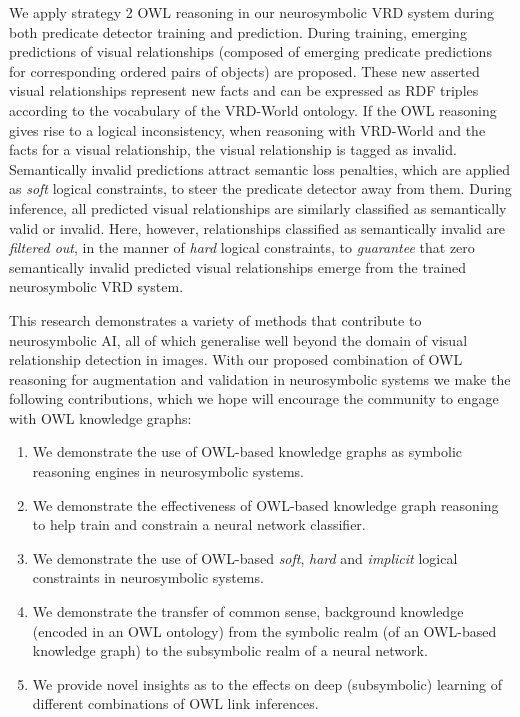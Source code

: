 \documentclass[]{jair}
\begin{document}
We apply strategy 2 OWL reasoning in our neurosymbolic VRD system during both predicate detector training and prediction.
During training, emerging predictions of visual relationships (composed of emerging predicate predictions for corresponding ordered pairs of objects) are proposed.
These new asserted visual relationships represent new facts and can be expressed as RDF triples \cite{RDFS/spec/2014} according to the vocabulary of the VRD-World ontology.
If the OWL reasoning gives rise to a logical inconsistency, when reasoning with VRD-World and the facts for a visual relationship, the visual relationship is tagged as invalid. 
Semantically invalid predictions attract semantic loss penalties, which are applied as \emph{soft} logical constraints, to steer the predicate detector away from them.
During inference, all predicted visual relationships are similarly classified as semantically valid or invalid. 
Here, however, relationships classified as semantically invalid are \emph{filtered out}, in the manner of \emph{hard} logical constraints, to \emph{guarantee} that zero semantically invalid predicted visual relationships emerge from the trained neurosymbolic VRD system.

This research demonstrates a variety of methods that contribute to neurosymbolic AI, all of which generalise well beyond the domain of visual relationship detection in images. 
With our proposed combination of OWL reasoning for augmentation and validation in neurosymbolic systems we make the following contributions, which we hope will encourage the community to engage with OWL knowledge graphs:
\begin{enumerate}[\it (i)]
  \item We demonstrate the use of OWL-based knowledge graphs as symbolic reasoning engines in neurosymbolic systems.
  \item We demonstrate the effectiveness of OWL-based knowledge graph reasoning to help train and constrain a neural network classifier.
  \item We demonstrate the use of OWL-based \emph{soft}, \emph{hard} and \emph{implicit} logical constraints in neurosymbolic systems.
  \item We demonstrate the transfer of common sense, background knowledge (encoded in an OWL ontology) from the symbolic realm (of an OWL-based knowledge graph) to the subsymbolic realm of a neural network.
  \item We provide novel insights as to the effects on deep (subsymbolic) learning of different combinations of OWL link inferences.  
\end{enumerate}
\end{document}
